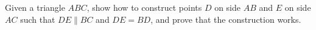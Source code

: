 Given a triangle $ABC$, show how to construct points $D$ on side $AB$ and $E$ on side $AC$ such that $DE\parallel BC$ and $DE=BD$, and prove that the construction works.
